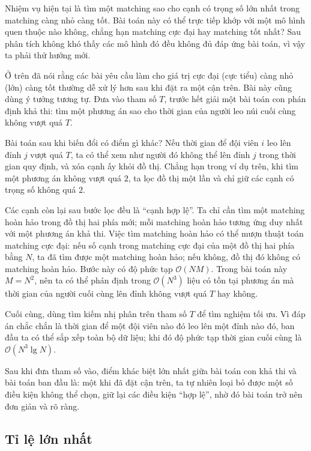 \documentclass[11pt]{article}
\newcommand{\Oh}{\mathcal{O}}
\begin{document}
Nhiệm vụ hiện tại là tìm một matching sao cho cạnh có trọng số lớn nhất trong
matching càng nhỏ càng tốt. Bài toán này có thể trực tiếp khớp với một mô hình
quen thuộc nào không, chẳng hạn matching cực đại hay matching tốt nhất? Sau
phân tích không khó thấy các mô hình đó đều không đủ đáp ứng bài toán, vì vậy
ta phải thử hướng mới.

Ở trên đã nói rằng các bài yêu cầu làm cho giá trị cực đại (cực tiểu) càng nhỏ
(lớn) càng tốt thường dễ xử lý hơn sau khi đặt ra một cận trên. Bài này cũng
dùng ý tưởng tương tự. Đưa vào tham số $T$, trước hết giải một bài toán con
phán định khả thi: tìm một phương án sao cho thời gian của người leo núi cuối
cùng không vượt quá $T$.

Bài toán sau khi biến đổi có điểm gì khác? Nếu thời gian để đội viên $i$ leo
lên đỉnh $j$ vượt quá $T$, ta có thể xem như người đó không thể lên đỉnh $j$
trong thời gian quy định, và xóa cạnh ấy khỏi đồ thị. Chẳng hạn trong ví dụ
trên, khi tìm một phương án không vượt quá $2$, ta lọc đồ thị một lần và chỉ
giữ các cạnh có trọng số không quá $2$.

Các cạnh còn lại sau bước lọc đều là ``cạnh hợp lệ''. Ta chỉ cần tìm một
matching hoàn hảo trong đồ thị hai phía mới; mỗi matching hoàn hảo tương ứng
duy nhất với một phương án khả thi. Việc tìm matching hoàn hảo có thể mượn
thuật toán matching cực đại: nếu số cạnh trong matching cực đại của một đồ thị
hai phía bằng $N$, ta đã tìm được một matching hoàn hảo; nếu không, đồ thị đó
không có matching hoàn hảo. Bước này có độ phức tạp $\Oh(NM)$. Trong bài toán
này $M=N^2$, nên ta có thể phán định trong $\Oh(N^3)$ liệu có tồn tại phương
án mà thời gian của người cuối cùng lên đỉnh không vượt quá $T$ hay không.

Cuối cùng, dùng tìm kiếm nhị phân trên tham số $T$ để tìm nghiệm tối ưu. Vì
đáp án chắc chắn là thời gian để một đội viên nào đó leo lên một đỉnh nào đó,
ban đầu ta có thể sắp xếp toàn bộ dữ liệu; khi đó độ phức tạp thời gian cuối
cùng là $\Oh(N^3\lg N)$.

Sau khi đưa tham số vào, điểm khác biệt lớn nhất giữa bài toán con khả thi và
bài toán ban đầu là: một khi đã đặt cận trên, ta tự nhiên loại bỏ được một số
điều kiện không thể chọn, giữ lại các điều kiện ``hợp lệ'', nhờ đó bài toán
trở nên đơn giản và rõ ràng.

\subsection{Tỉ lệ lớn nhất}
\end{document}
